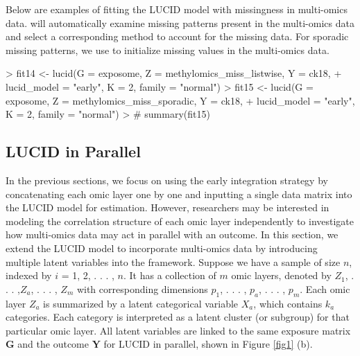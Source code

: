 Below are examples of fitting the LUCID model with missingness in multi-omics data.  will automatically examine missing patterns present in the multi-omics data and select a corresponding method to account for the missing data. For sporadic missing patterns, we use  to initialize missing values in the multi-omics data. 
\begin{example}
> fit14 <- lucid(G = exposome, Z = methylomics_miss_listwise, Y = ck18, 
+                lucid_model = "early", K = 2, family = "normal")
> fit15 <- lucid(G = exposome, Z = methylomics_miss_sporadic, Y = ck18, 
+                lucid_model = "early", K = 2, family = "normal")
> # summary(fit15)
\end{example}

\subsection{LUCID in Parallel} \label{sec_parallel}
In the previous sections, we focus on using the early integration strategy by concatenating each omic layer one by one and inputting a single data matrix into the LUCID model for estimation. However, researchers may be interested in modeling the correlation structure of each omic layer independently to investigate how multi-omics data may act in parallel with an outcome. In this section, we extend the LUCID model to incorporate multi-omics data by introducing multiple latent variables into the framework. Suppose we have a sample of size $n$, indexed by $i$ = 1, 2, . . . , $n$. It has a collection of $m$ omic layers, denoted by $Z_1$, . . . ,$Z_a$, . . . , $Z_m$ with corresponding dimensions $p_1$, . . . , $p_a$, . . . , $p_m$. Each omic layer $Z_a$ is summarized by a latent categorical variable $X_a$, which contains $k_a$ categories. Each category is interpreted as a latent cluster (or subgroup) for that particular omic layer. All latent variables are linked to the same exposure matrix $\bm G$ and the outcome $\bm Y$ for LUCID in parallel, shown in Figure \ref{fig1} (b). 

